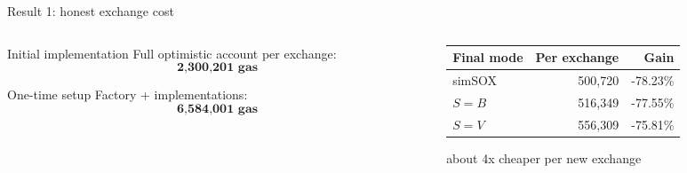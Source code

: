 \documentclass[aspectratio=169,10pt]{beamer}
\newcommand{\simsox}{simSOX}
\newcommand{\gas}[1]{\textbf{#1 gas}}
\begin{document}
\begin{frame}{Result 1: honest exchange cost}
  \begin{columns}[T,onlytextwidth]
    \begin{column}{0.44\textwidth}
      \begin{block}{Initial implementation}
        Full optimistic account per exchange:
        \[
          \gas{2,300,201}
        \]
      \end{block}
      \begin{block}{One-time setup}
        Factory + implementations:
        \[
          \gas{6,584,001}
        \]
      \end{block}
    \end{column}
    \begin{column}{0.52\textwidth}
      \begin{center}
        \begin{tabular}{lrr}
          \toprule
          Final mode & Per exchange & Gain \\
          \midrule
          \simsox{} & 500,720 & -78.23\% \\
          \(S=B\) & 516,349 & -77.55\% \\
          \(S=V\) & 556,309 & -75.81\% \\
          \bottomrule
        \end{tabular}
      \end{center}
      \vspace{0.8em}
      \centering
      \Large \textcolor{goodgreen}{about 4x cheaper per new exchange}
    \end{column}
  \end{columns}
\end{frame}
\end{document}
